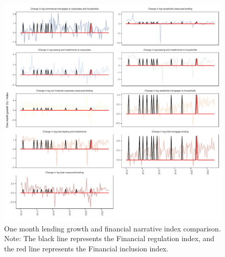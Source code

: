 \documentclass[
  letterpaper,
  DIV=11,
  numbers=noendperiod]{scrartcl}
\begin{document}
\begin{figure}[H]

{\centering \includegraphics{UP_paper_files/figure-pdf/fig-comp_narrative_indexes_one_month-1.pdf}

}

\caption{\label{fig-comp_narrative_indexes_one_month}One month lending
growth and financial narrative index comparison. Note: The black line
represents the Financial regulation index, and the red line represents
the Financial inclusion index.}

\end{figure}

\newpage
\end{document}
